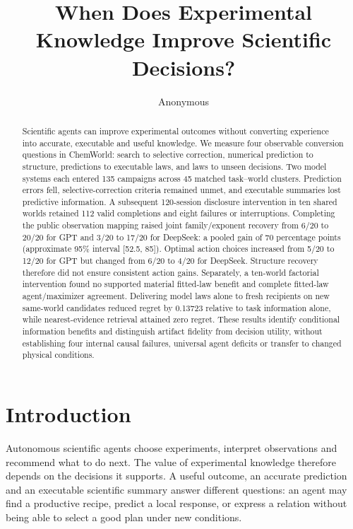 \documentclass{article}
\title{When Does Experimental Knowledge Improve Scientific Decisions?}
\author{Anonymous}
\begin{document}
\maketitle
\raggedbottom

\begin{abstract}
Scientific agents can improve experimental outcomes without converting
experience into accurate, executable and useful knowledge. We measure
four observable conversion questions in ChemWorld: search to selective
correction, numerical prediction to structure, predictions to executable
laws, and laws to unseen decisions. Two model systems each entered 135
campaigns across 45 matched task--world clusters. Prediction errors
fell, selective-correction criteria remained unmet, and executable
summaries lost predictive information. A subsequent 120-session
disclosure intervention in ten shared worlds retained 112 valid
completions and eight failures or interruptions. Completing the public
observation mapping raised joint family/exponent recovery from 6/20 to
20/20 for GPT and 3/20 to 17/20 for DeepSeek: a pooled gain of 70
percentage points (approximate 95\% interval {[}52.5, 85{]}). Optimal
action choices increased from 5/20 to 12/20 for GPT but changed from
6/20 to 4/20 for DeepSeek. Structure recovery therefore did not ensure
consistent action gains. Separately, a ten-world factorial intervention
found no supported material fitted-law benefit and complete fitted-law
agent/maximizer agreement. Delivering model laws alone to fresh
recipients on new same-world candidates reduced regret by 0.13723
relative to task information alone, while nearest-evidence retrieval
attained zero regret. These results identify conditional information
benefits and distinguish artifact fidelity from decision utility,
without establishing four internal causal failures, universal agent
deficits or transfer to changed physical conditions.
\end{abstract}

\section{Introduction}\label{introduction}

Autonomous scientific agents choose experiments, interpret observations
and recommend what to do next. The value of experimental knowledge
therefore depends on the decisions it supports. A useful outcome, an
accurate prediction and an executable scientific summary answer
different questions: an agent may find a productive recipe, predict a
local response, or express a relation without being able to select a
good plan under new conditions.
\end{document}
